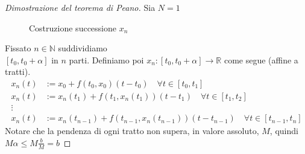 \begin{proof}[Dimostrazione del teorema di Peano]
    Sia \(N = 1\) 
\begin{figure}[ht]
    \centering
    \caption{Costruzione successione \(x_{n}\)}\label{fig:teo_peano}
\end{figure}
Fissato \(n \in \mathbb{N}\) suddividiamo \\ \([t_{0}, t_{0}+\alpha]\) in \(n\)
parti. Definiamo poi \(x_{n} : [t_{0}, t_{0} + \alpha] \to  \mathbb{R}\) come
segue (affine a tratti).
\begin{align*}
    x_{n}(t) &:= x_{0} + f(t_{0}, x_{0})(t - t_{0}) \quad \forall t \in [t_{0},
    t_{1}] \\
    x_n(t) &:= x_{n}(t_{1}) + f(t_{1}, x_{n}(t_{1}))(t - t_{1}) \quad \forall t
    \in [t_{1}, t_{2}] \\
    \vdots \\
    x_{n}(t) &:= x_{n}(t_{n-1}) + f(t_{n-1}, x_{n}(t_{n-1}))(t - t_{n-1}) \quad
    \forall t \in [t_{n-1}, t_{n}]
\end{align*} 
Notare che la pendenza di ogni tratto non supera, in valore assoluto, \(M\),
quindi \(M\alpha \le M \frac{b}{M} =b\) 


\end{proof}
